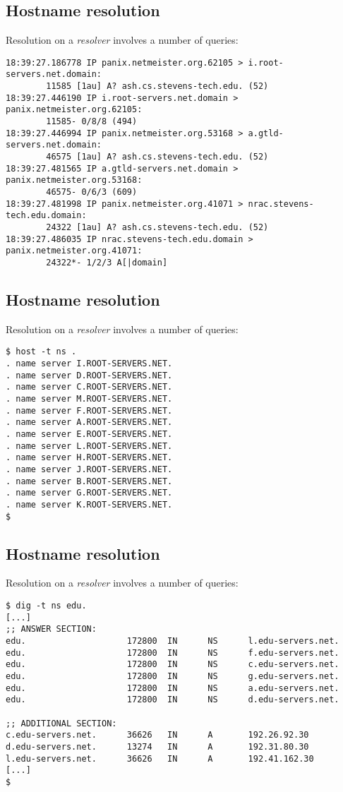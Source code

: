 \documentclass[xga]{xdvislides}
\begin{document}
\subsection{Hostname resolution}
Resolution on a {\em resolver} involves a number of queries:
\begin{verbatim}
18:39:27.186778 IP panix.netmeister.org.62105 > i.root-servers.net.domain:
        11585 [1au] A? ash.cs.stevens-tech.edu. (52)
18:39:27.446190 IP i.root-servers.net.domain > panix.netmeister.org.62105:
        11585- 0/8/8 (494)
18:39:27.446994 IP panix.netmeister.org.53168 > a.gtld-servers.net.domain:
        46575 [1au] A? ash.cs.stevens-tech.edu. (52)
18:39:27.481565 IP a.gtld-servers.net.domain > panix.netmeister.org.53168:
        46575- 0/6/3 (609)
18:39:27.481998 IP panix.netmeister.org.41071 > nrac.stevens-tech.edu.domain:
        24322 [1au] A? ash.cs.stevens-tech.edu. (52)
18:39:27.486035 IP nrac.stevens-tech.edu.domain > panix.netmeister.org.41071:
        24322*- 1/2/3 A[|domain]
\end{verbatim}
\Normalsize

\subsection{Hostname resolution}
Resolution on a {\em resolver} involves a number of queries:
\begin{verbatim}
$ host -t ns .
. name server I.ROOT-SERVERS.NET.
. name server D.ROOT-SERVERS.NET.
. name server C.ROOT-SERVERS.NET.
. name server M.ROOT-SERVERS.NET.
. name server F.ROOT-SERVERS.NET.
. name server A.ROOT-SERVERS.NET.
. name server E.ROOT-SERVERS.NET.
. name server L.ROOT-SERVERS.NET.
. name server H.ROOT-SERVERS.NET.
. name server J.ROOT-SERVERS.NET.
. name server B.ROOT-SERVERS.NET.
. name server G.ROOT-SERVERS.NET.
. name server K.ROOT-SERVERS.NET.
$
\end{verbatim}

\subsection{Hostname resolution}
Resolution on a {\em resolver} involves a number of queries:
\begin{verbatim}
$ dig -t ns edu.
[...]
;; ANSWER SECTION:
edu.                    172800  IN      NS      l.edu-servers.net.
edu.                    172800  IN      NS      f.edu-servers.net.
edu.                    172800  IN      NS      c.edu-servers.net.
edu.                    172800  IN      NS      g.edu-servers.net.
edu.                    172800  IN      NS      a.edu-servers.net.
edu.                    172800  IN      NS      d.edu-servers.net.

;; ADDITIONAL SECTION:
c.edu-servers.net.      36626   IN      A       192.26.92.30
d.edu-servers.net.      13274   IN      A       192.31.80.30
l.edu-servers.net.      36626   IN      A       192.41.162.30
[...]
$
\end{verbatim}
\Normalsize
\end{document}
